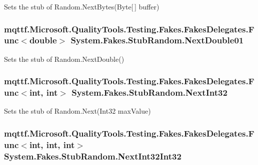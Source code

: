 Sets the stub of Random.\-Next\-Bytes(\-Byte\mbox{[}$\,$\mbox{]} buffer)

\hypertarget{class_system_1_1_fakes_1_1_stub_random_ac6d762f757b6bd2ac89969f681d6c9a5}{
\subsubsection[{Next\-Double01}]{\setlength{\rightskip}{0pt plus 5cm}mqttf.\-Microsoft.\-Quality\-Tools.\-Testing.\-Fakes.\-Fakes\-Delegates.\-Func$<$double$>$ System.\-Fakes.\-Stub\-Random.\-Next\-Double01}}\label{class_system_1_1_fakes_1_1_stub_random_ac6d762f757b6bd2ac89969f681d6c9a5}


Sets the stub of Random.\-Next\-Double()

\hypertarget{class_system_1_1_fakes_1_1_stub_random_a79180cc57c0f0c0e27dc811713b87585}{
\subsubsection[{Next\-Int32}]{\setlength{\rightskip}{0pt plus 5cm}mqttf.\-Microsoft.\-Quality\-Tools.\-Testing.\-Fakes.\-Fakes\-Delegates.\-Func$<$int, int$>$ System.\-Fakes.\-Stub\-Random.\-Next\-Int32}}\label{class_system_1_1_fakes_1_1_stub_random_a79180cc57c0f0c0e27dc811713b87585}


Sets the stub of Random.\-Next(\-Int32 max\-Value)

\hypertarget{class_system_1_1_fakes_1_1_stub_random_a5e9be99ce52de716c58668512fd06787}{
\subsubsection[{Next\-Int32\-Int32}]{\setlength{\rightskip}{0pt plus 5cm}mqttf.\-Microsoft.\-Quality\-Tools.\-Testing.\-Fakes.\-Fakes\-Delegates.\-Func$<$int, int, int$>$ System.\-Fakes.\-Stub\-Random.\-Next\-Int32\-Int32}}\label{class_system_1_1_fakes_1_1_stub_random_a5e9be99ce52de716c58668512fd06787}


